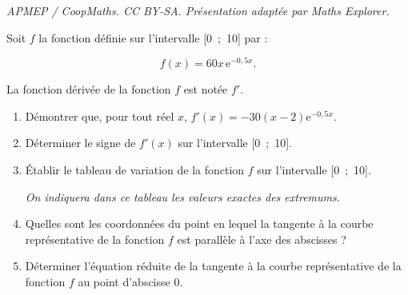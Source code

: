 \documentclass[10pt]{article}
\providecommand{\e}{{\mathrm{e}}}
\begin{document}
\noindent\textit{APMEP / CoopMaths. CC BY-SA. Présentation adaptée par Maths Explorer.}\par\medskip
\medskip

Soit $f$ la fonction définie sur l'intervalle [0~;~10] par : 

\[f(x)= 60x\,\e^{- 0,5x}.\]

La fonction dérivée de la fonction $f$ est notée $f'$.

\medskip

\begin{enumerate}
\item Démontrer que, pour tout réel $x$, $f'(x) = - 30(x - 2)\e^{-0,5x}$.
\item Déterminer le signe de $f'(x)$ sur l'intervalle [0~;~10].
\item Établir le tableau de variation de la fonction $f$ sur l'intervalle [0~;~10].

\emph{On indiquera dans ce tableau les valeurs exactes des extremums.}
\item Quelles sont les coordonnées du point en lequel la tangente à la courbe représentative de
la fonction $f$ est parallèle à l'axe des abscisses ?
\item Déterminer l'équation réduite de la tangente à la courbe représentative de la fonction $f$
au point d'abscisse 0.
\end{enumerate}

\vspace{0,5cm}
\end{document}

